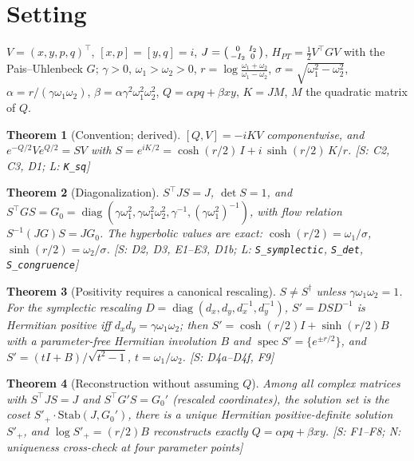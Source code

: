 \documentclass{article}
\newtheorem{theorem}{Theorem}
\newcommand{\w}{\omega}
\begin{document}
\section*{Setting}
$V=(x,y,p,q)^\top$, $[x,p]=[y,q]=i$, $J=\begin{psmallmatrix}0&I_2\\-I_2&0\end{psmallmatrix}$,
$H_{PT}=\tfrac12 V^\top G V$ with the Pais--Uhlenbeck $G$; $\gamma>0$,
$\w_1>\w_2>0$, $r=\log\frac{\w_1+\w_2}{\w_1-\w_2}$, $\sigma=\sqrt{\w_1^2-\w_2^2}$,
$\alpha=r/(\gamma\w_1\w_2)$, $\beta=\alpha\gamma^2\w_1^2\w_2^2$,
$Q=\alpha pq+\beta xy$, $K=JM$, $M$ the quadratic matrix of $Q$.

\begin{theorem}[Convention; derived]\label{thm:conv}
$[Q,V]=-iKV$ componentwise, and
$e^{-Q/2}Ve^{Q/2}=SV$ with
$S=e^{iK/2}=\cosh(r/2)\,I+i\,\sinh(r/2)\,K/r$.
{\rm [S: C2, C3, D1; L: \texttt{K\_sq}]}
\end{theorem}

\begin{theorem}[Diagonalization]\label{thm:diag}
$S^\top JS=J$, $\det S=1$, and $S^\top GS=G_0=
\operatorname{diag}(\gamma\w_1^2,\gamma\w_1^2\w_2^2,\gamma^{-1},(\gamma\w_1^2)^{-1})$,
with flow relation $S^{-1}(JG)S=JG_0$. The hyperbolic values are exact:
$\cosh(r/2)=\w_1/\sigma$, $\sinh(r/2)=\w_2/\sigma$.
{\rm [S: D2, D3, E1--E3, D1b; L: \texttt{S\_symplectic}, \texttt{S\_det}, \texttt{S\_congruence}]}
\end{theorem}

\begin{theorem}[Positivity requires a canonical rescaling]\label{thm:resc}
$S\ne S^\dagger$ unless $\gamma\w_1\w_2=1$. For the symplectic rescaling
$D=\operatorname{diag}(d_x,d_y,d_x^{-1},d_y^{-1})$, $S'=DSD^{-1}$ is Hermitian
positive iff $d_xd_y=\gamma\w_1\w_2$; then $S'=\cosh(r/2)I+\sinh(r/2)B$ with a
parameter-free Hermitian involution $B$ and $\operatorname{spec}S'=\{e^{\pm r/2}\}$,
and $S'=(tI+B)/\sqrt{t^2-1}$, $t=\w_1/\w_2$.
{\rm [S: D4a--D4f, F9]}
\end{theorem}

\begin{theorem}[Reconstruction without assuming $Q$]\label{thm:recon}
Among all complex matrices with $S^\top JS=J$ and $S^\top G'S=G_0'$ (rescaled
coordinates), the solution set is the coset $S'_+\cdot\mathrm{Stab}(J,G_0')$,
there is a unique Hermitian positive-definite solution $S'_+$, and
$\log S'_+=(r/2)B$ reconstructs exactly $Q=\alpha pq+\beta xy$.
{\rm [S: F1--F8; N: uniqueness cross-check at four parameter points]}
\end{theorem}
\end{document}
